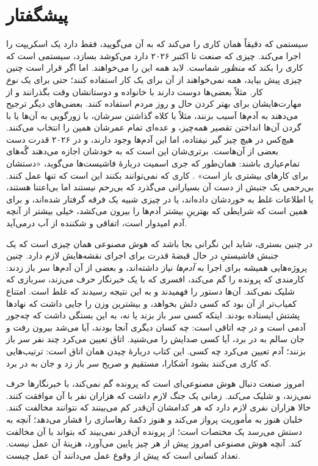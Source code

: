 \chapter*{پیشگفتار}
سیستمی که دقیقاً همان کاری را می‌کند که به آن می‌گویید، فقط دارد یک اسکریپت را اجرا می‌کند. چیزی که صنعت تا اکتبر ۲۰۲۶ دارد می‌کوشد بسازد، سیستمی است که کاری را بکند که \emph{منظور} شماست. لابد همه این را می‌خواهند. اما اگر قرار است چنین چیزی پیش بیاید، همه نمی‌خواهند از آن برای یک کار استفاده کنند؛ حتی برای یک \emph{نوع} کار. مثلاً بعضی‌ها دوست دارند با خانواده و دوستانشان وقت بگذرانند و از مهارت‌هایشان برای بهتر کردن حال و روز مردم استفاده کنند. بعضی‌های دیگر ترجیح می‌دهند به آدم‌ها آسیب بزنند، مثلاً با کلاه گذاشتن سرشان، با زورگویی به آن‌ها یا با گردن آن‌ها انداختن تقصیر همه‌چیز، و عده‌ای تمام عمرشان همین را انتخاب می‌کنند. هیچ‌کس در هیچ چیز گیر نیفتاده، اما این آدم‌ها وجود دارند، و در ۲۰۲۶ قدرت دست بعضی از آن‌هاست. برتری‌شان این است که به خودشان اجازه می‌دهند گُه‌های تمام‌عیاری باشند: همان‌طور که جری اسمیت دربارهٔ فاشیست‌ها می‌گوید، «دستشان برای کارهای بیشتری باز است» \autocite{rickandmorty2023}. کاری که نمی‌توانند بکنند این است که تنها عمل کنند. بی‌رحمی یک جنبش از دست آن بسیارانی می‌گذرد که بی‌رحم نیستند اما بی‌اعتنا هستند، یا اطلاعات غلط به خوردشان داده‌اند، یا در چیزی شبیه یک فرقه گرفتار شده‌اند، و برای همین است که شرایطی که بهترینِ بیشتر آدم‌ها را بیرون می‌کشد، خیلی بیشتر از آنچه آدم امیدوار است، اتفاقی و شکننده از آب درمی‌آید.

در چنین بستری، شاید این نگرانی بجا باشد که هوش مصنوعی همان چیزی است که یک جنبش فاشیستیِ در حال قبضهٔ قدرت برای اجرای نقشه‌هایش لازم دارد. چنین پروژه‌هایی همیشه برای اجرا به \emph{آدم‌ها} نیاز داشته‌اند، و بعضی از آن آدم‌ها سر باز زدند: کارمندی که پرونده را گم می‌کند، افسری که با یک خبرنگار حرف می‌زند، سربازی که شلیک نمی‌کند. آن‌ها دستور را فهمیدند و به این نتیجه رسیدند که غلط است. امتناع کمیاب‌تر از آن بود که کسی دلش بخواهد، و بیشترین وزن را جایی داشت که نهادها پشتش ایستاده بودند. اینکه کسی سر باز بزند یا نه، به این بستگی داشت که چه‌جور آدمی است و در چه اتاقی است: چه کسان دیگری آنجا بودند، آیا می‌شد بیرون رفت و جان سالم به در برد، آیا کسی صدایش را می‌شنید. اتاق تعیین می‌کرد چند نفر سر باز بزنند؛ آدم تعیین می‌کرد چه کسی. این کتاب دربارهٔ چیدن همان اتاق است: ترتیب‌هایی که کاری می‌کنند بشود آشکارا، مستقیم و صریح سر باز زد و جان به در برد.

امروز صنعت دنبال هوش مصنوعی‌ای است که پرونده گم نمی‌کند، با خبرنگارها حرف نمی‌زند، و شلیک \emph{می‌کند}. زمانی یک جنگ لازم داشت که هزاران نفر با آن موافقت کنند. حالا هزاران نفری لازم دارد که هر کدامشان آن‌قدر کم می‌بینند که نتوانند مخالفت کنند. خلبان هنوز به مأموریت پرواز می‌کند و هنوز دکمهٔ رهاسازی را فشار می‌دهد؛ آنچه به دستش می‌رسد یک مختصات است؛ از پرونده آن‌قدر نمی‌بیند که بتواند با آن مخالفت کند. آنچه هوش مصنوعی امروز پیش از هر چیز پایین می‌آورد، هزینهٔ آن عمل نیست. تعداد کسانی است که پیش از وقوع عمل می‌دانند آن عمل چیست.

